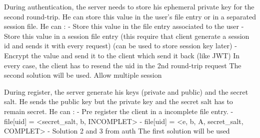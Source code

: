 ﻿\documentclass[../report.tex]{subfiles}
\begin{document}
During authentication, the server needs to store his ephemeral private key for the second round-trip. He can store this value in the user's file entry or in a separated session file.
He can :
- Store this value in the file entry associated to the user
- Store this value in a session file entry (this require that client generate a session id and sends it with every request) (can be used to store session key later)
- Encrypt the value and send it to the client which send it back (like JWT)
In every case, the client has to resend the uid in the 2nd round-trip request
The second solution will be used. Allow multiple session
 

During register, the server generate his keys (private and public) and the secret salt. He sends the public key but the private key and the secret salt has to remain secret.
He can :
- Pre register the client in a incomplete file entry.
   - file[uid] = <secret\_salt, b, INCOMPLET>
   - file[uid] = <e, b, A, secret\_salt, COMPLET>
- Solution 2 and 3 from auth
The first solution will be used
\end{document}
